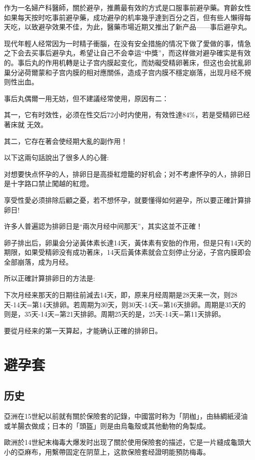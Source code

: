 \documentclass[12pt,UTF8]{ctexbook}
\begin{document}
作为一名婦产科醫師，關於避孕，推薦最有效的方式是口服事前避孕藥。育齡女性如果每天按时吃事前避孕藥，成功避孕的机率幾乎達到百分之百，但有些人懶得每天吃，以致避孕效果不佳，为此，醫藥市場近期又推出了新产品——事后避孕丸。

现代年輕人经常因为一时精子衝腦，在没有安全措施的情况下做了愛做的事，情急之下会去买事后避孕丸，希望让自己不会幸运“中獎”，而这样做对避孕確实是有效的。事后丸的作用机轉是让子宫内膜起变化，而妨礙受精卵著床，但这也会扰亂卵巢分泌荷爾蒙和子宫内膜的相对應關係，造成子宫内膜不穩定崩落，出现月经不規则性出血。

事后丸偶爾一用无妨，但不建議经常使用，原因有二：

其一，它有时效性，必须在性交后72小时内使用，有效性達84\%，若是受精卵已经著床就
无效。

其二，它存在著会使经期大亂的副作用！

以下这兩句話說出了很多人的心聲:

对想要快点怀孕的人，排卵日是高掛紅燈籠的好机会；对不考慮怀孕的人，排卵日是十字路口禁止闖越的紅燈。

享受性愛必须排除后顧之憂，若不想怀孕，就要懂得如何避孕，所以要正確計算排卵日!

许多人普遍認为排卵日是“兩次月经中间那天”，其实这並不正確！

卵子排出后，卵巢会分泌黃体素长達14天，黃体素有安胎的作用，但是只有14天的期限，如果受精卵没有成功著床，14天后黃体素就会立刻停止分泌，子宫内膜即会全部崩落，成为月经。

所以正確計算排卵日的方法是:

下次月经来那天的日期往前減去14天，即，原来月经周期是28天来一次，则28天-14天=第14天排卵。若周期为30天，则30天-14天=第16天排卵。周期是35天的则是，35天-14天=第21天排卵。周期25天的是，25天-14天=第11天排卵。

要從月经来的第一天算起，才能确认正確的排卵日。

\section{避孕套}

\subsection{历史}

亞洲在15世紀以前就有關於保險套的記錄，中國當时称为「阴枷」，由絲綢紙浸油或羊腸衣做成；日本的「頭盔」则是由烏龜殼或其他動物的角製成。

歐洲於14世紀末梅毒大爆发时出现了關於使用保險套的描述，它是一片縫成龜頭大小的亞麻布，用繫帶固定在阴莖上，这款保險套经證明能預防梅毒。
\end{document}
